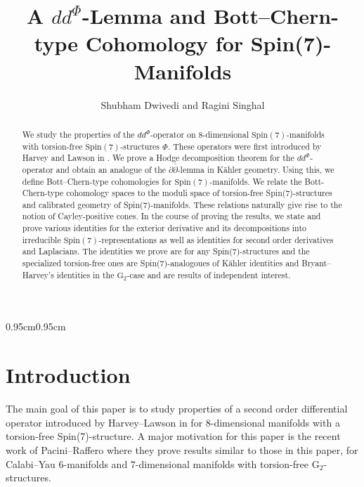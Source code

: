 \documentclass[10pt,a4paper,reqno]{article}
\makeatletter
\def\blfootnote{\xdef\@thefnmark{}\@footnotetext}
\renewcommand\tableofcontents{%
	\@starttoc{toc}%
	
}
\theoremstyle{definition}
\numberwithin{equation}{section}
\def\pt{\partial}
\def\G2{\mathrm{G}_2}
\def\S7{\mathrm{Spin}(7)}
\def\ddphi{dd^{\Phi}}
\makeatother
\begin{document}
\title{A $dd^\Phi$-Lemma and Bott–Chern-type Cohomology for Spin(7)-Manifolds}    
\author{Shubham Dwivedi and Ragini Singhal}	

\date{}

\maketitle


\begin{abstract}
\noindent
We study the properties of the $\ddphi$-operator on $8$-dimensional $\S7$-manifolds with torsion-free $\S7$-structures $\Phi$. These operators were first introduced by Harvey and Lawson in \cite{HL-intropotential}. We prove a Hodge decomposition theorem for the $dd^\Phi$-operator and obtain an analogue of the $\pt \bar{\pt}$-lemma in Kähler geometry. Using this, we define Bott--Chern-type cohomologies for $\S7$-manifolds. We relate the Bott-Chern-type cohomology spaces to the moduli space of torsion-free Spin(7)-structures and calibrated geometry of Spin(7)-manifolds. These relations naturally give rise to the notion of Cayley-positive cones. In the course of proving the results, we state and prove various identities for the exterior derivative and its decompositions into irreducible $\S7$-representations as well as identities for second order derivatives and Laplacians. The identities we prove are for any Spin(7)-structures and the specialized torsion-free ones are Spin(7)-analogoues of Kähler identities and Bryant--Harvey's identities in the $\G2$-case \cite{bryant-someremarks} and are results of independent interest.

\end{abstract}

 \begin{adjustwidth}{0.95cm}{0.95cm}
    \tableofcontents
 \end{adjustwidth}

\blfootnote{\emph{MSC (2020): 53E99, 53C29, 53C21, 53C15.}}

\section{Introduction}\label{sec:intro}

The main goal of this paper is to study properties of a second order differential operator introduced by Harvey--Lawson in \cite{HL-intropotential} for $8$-dimensional manifolds with a torsion-free Spin(7)-structure. A major motivation for this paper is the recent work of Pacini--Raffero \cite{pacini-raferro-pluripotential} where they prove results similar to those in this paper, for Calabi--Yau $6$-manifolds and $7$-dimensional manifolds with torsion-free $\G2$-structures.
\end{document}
